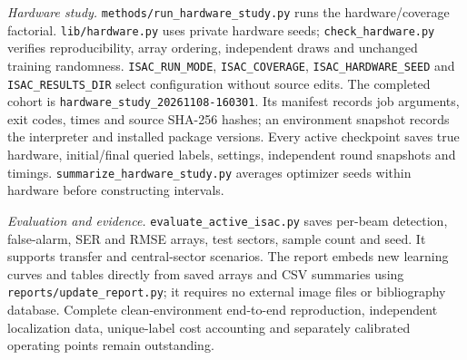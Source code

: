 \documentclass[conference]{IEEEtran}
\begin{document}
\emph{Hardware study.} \texttt{methods/run\_hardware\_study.py} runs the hardware/coverage factorial. \texttt{lib/hardware.py} uses private hardware seeds; \texttt{check\_hardware.py} verifies reproducibility, array ordering, independent draws and unchanged training randomness. \texttt{ISAC\_RUN\_MODE}, \texttt{ISAC\_COVERAGE}, \texttt{ISAC\_HARDWARE\_SEED} and \texttt{ISAC\_RESULTS\_DIR} select configuration without source edits. The completed cohort is \texttt{hardware\_study\_20261108-160301}. Its manifest records job arguments, exit codes, times and source SHA-256 hashes; an environment snapshot records the interpreter and installed package versions. Every active checkpoint saves true hardware, initial/final queried labels, settings, independent round snapshots and timings. \texttt{summarize\_hardware\_study.py} averages optimizer seeds within hardware before constructing intervals.

\emph{Evaluation and evidence.} \texttt{evaluate\_active\_isac.py} saves per-beam detection, false-alarm, SER and RMSE arrays, test sectors, sample count and seed. It supports transfer and central-sector scenarios. The report embeds new learning curves and tables directly from saved arrays and CSV summaries using \texttt{reports/update\_report.py}; it requires no external image files or bibliography database. Complete clean-environment end-to-end reproduction, independent localization data, unique-label cost accounting and separately calibrated operating points remain outstanding.
\end{document}
